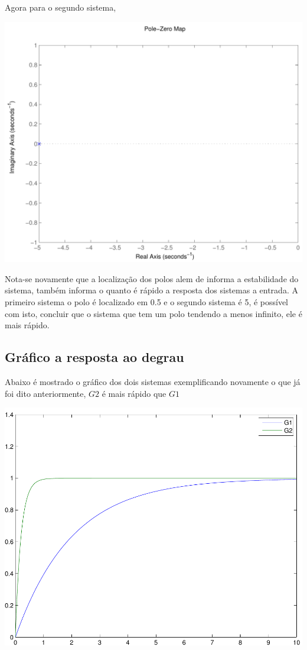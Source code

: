\documentclass[paper=a4, fontsize=11pt]{article}
\begin{document}
Agora para o segundo sistema,

\begin{center}
    \includegraphics[scale=0.5]{q4pzg2.pdf}
\end{center}

Nota-se novamente que a localização dos polos alem de informa a estabilidade do sistema,
também informa o quanto é rápido a resposta dos sistemas a entrada. A primeiro sistema
o polo é localizado em 0.5 e o segundo sistema é 5, é possível com isto, concluir que
o sistema que tem um polo tendendo a menos infinito, ele é mais rápido.

\newpage

\subsection{Gráfico a resposta ao degrau}

Abaixo é mostrado o gráfico dos dois sistemas exemplificando novamente o que já foi 
dito anteriormente, $G2$ é mais rápido que $G1$

\begin{center}
    \includegraphics[scale=0.5]{q4ic.pdf}
\end{center}
\end{document}

